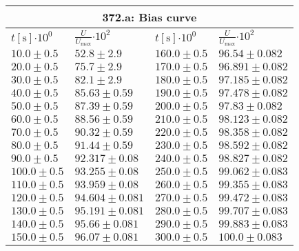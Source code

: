 \documentclass{article}
\begin{document}
\begin{tabular}{|p{3cm}|p{3cm}||p{3cm}|p{3cm}|}
\hline
\multicolumn{4}{|c|}{372.a: Bias curve}\\
\hline
$t[\textrm{s}]$$\cdot 10^{0}$&$\frac{U}{U_{\textrm{max}}}$$\cdot 10^{2}$&$t[\textrm{s}]$$\cdot 10^{0}$&$\frac{U}{U_{\textrm{max}}}$$\cdot 10^{2}$\\
\hline
$10.0\pm0.5$&$52.8\pm 2.9$&$160.0\pm0.5$&$96.54\pm 0.082$\\
$20.0\pm0.5$&$75.7\pm 2.9$&$170.0\pm0.5$&$96.891\pm 0.082$\\
$30.0\pm0.5$&$82.1\pm 2.9$&$180.0\pm0.5$&$97.185\pm 0.082$\\
$40.0\pm0.5$&$85.63\pm 0.59$&$190.0\pm0.5$&$97.478\pm 0.082$\\
$50.0\pm0.5$&$87.39\pm 0.59$&$200.0\pm0.5$&$97.83\pm 0.082$\\
$60.0\pm0.5$&$88.56\pm 0.59$&$210.0\pm0.5$&$98.123\pm 0.082$\\
$70.0\pm0.5$&$90.32\pm 0.59$&$220.0\pm0.5$&$98.358\pm 0.082$\\
$80.0\pm0.5$&$91.44\pm 0.59$&$230.0\pm0.5$&$98.592\pm 0.082$\\
$90.0\pm0.5$&$92.317\pm 0.08$&$240.0\pm0.5$&$98.827\pm 0.082$\\
$100.0\pm0.5$&$93.255\pm 0.08$&$250.0\pm0.5$&$99.062\pm 0.083$\\
$110.0\pm0.5$&$93.959\pm 0.08$&$260.0\pm0.5$&$99.355\pm 0.083$\\
$120.0\pm0.5$&$94.604\pm 0.081$&$270.0\pm0.5$&$99.472\pm 0.083$\\
$130.0\pm0.5$&$95.191\pm 0.081$&$280.0\pm0.5$&$99.707\pm 0.083$\\
$140.0\pm0.5$&$95.66\pm 0.081$&$290.0\pm0.5$&$99.883\pm 0.083$\\
$150.0\pm0.5$&$96.07\pm 0.081$&$300.0\pm0.5$&$100.0\pm 0.083$\\
\hline
\end{tabular}
\end{document}
